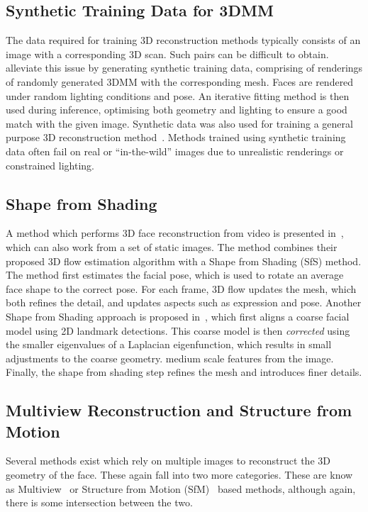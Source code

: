 \subsection{Synthetic Training Data for 3DMM}
The data required for training 3D reconstruction methods typically
consists of an image with a corresponding 3D scan. Such pairs can be
difficult to
obtain. \citeauthor{richardson20163d}~\cite{richardson20163d}
alleviate this issue by generating synthetic training data, comprising
of renderings of randomly generated 3DMM with the corresponding
mesh. Faces are rendered under random lighting conditions and pose. An
iterative fitting method is then used during inference, optimising
both geometry and lighting to ensure a good match with the given
image. Synthetic data was also used for training a general purpose 3D
reconstruction method~\cite{li2015joint}. Methods trained using
synthetic training data often fail on real or ``in-the-wild'' images
due to unrealistic renderings or constrained lighting.



\subsection{Shape from Shading}
A method which performs 3D face reconstruction from video is presented
in~\cite{suwajanakorn2014total}, which can also work from a set of
static images. The method combines their proposed 3D flow estimation
algorithm with a Shape from Shading (SfS) method. The method first
estimates the facial pose, which is used to rotate an average face
shape to the correct pose. For each frame, 3D flow updates the mesh,
which both refines the detail, and updates aspects such as expression
and pose. Another Shape from Shading approach is proposed
in~\cite{jiang20183d}, which first aligns a coarse facial model using
2D landmark detections. This coarse model is then \textit{corrected}
using the smaller eigenvalues of a Laplacian eigenfunction, which
results in small adjustments to the coarse geometry.  medium scale
features from the image. Finally, the shape from shading step refines
the mesh and introduces finer details.

\subsection{Multiview Reconstruction and Structure from Motion}

Several methods exist which rely on multiple images to reconstruct the
3D geometry of the face. These again fall into two more
categories. These are know as Multiview~\cite{mayo20093d,dou2018multi}
or Structure from Motion
(SfM)~\cite{dou2018multi,dai2018coarse,Piotraschke_2016_CVPR} based
methods, although again, there is some intersection between the two.

